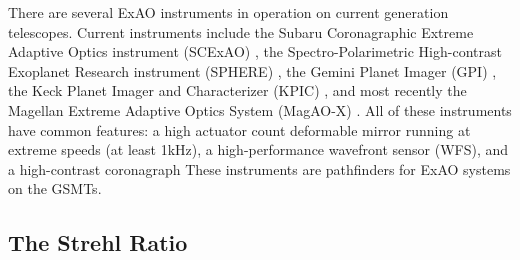 There are several ExAO instruments in operation on current generation telescopes. Current instruments include the Subaru Coronagraphic Extreme Adaptive Optics instrument (SCExAO) \citep{jovanovic2015subaru}, the Spectro-Polarimetric High-contrast Exoplanet Research instrument (SPHERE) \citep{beuzit2008sphere}, the Gemini Planet Imager (GPI) \citep{macintosh2014first}, the Keck Planet Imager and Characterizer (KPIC) \citep{jovanovic2019keck}, and most recently the Magellan Extreme Adaptive Optics System (MagAO-X) \citep{males2020magao}. All of these instruments have common features: a high actuator count deformable mirror running at extreme speeds (at least 1kHz), a high-performance wavefront sensor (WFS), and a high-contrast coronagraph These instruments are pathfinders for ExAO systems on the GSMTs.










\subsection{The Strehl Ratio}

